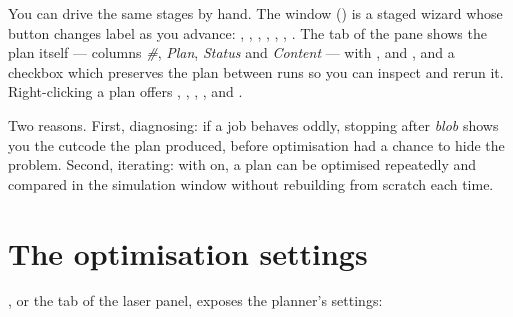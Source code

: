 \noindent You can drive the same stages by hand. The  window
() is a staged wizard whose button changes label as you
advance: , , , , , , . The
 tab of the  pane shows the plan itself ---
columns \emph{\#}, \emph{Plan}, \emph{Status} and \emph{Content} --- with
,  and , and a  checkbox which
preserves the plan between runs so you can inspect and rerun it. Right-clicking a
plan offers , , , ,
 and .

\begin{behindbox}
Two reasons. First, diagnosing: if a job behaves oddly, stopping after
\emph{blob} shows you the cutcode the plan produced, before optimisation had a
chance to hide the problem. Second, iterating: with  on, a plan can be
optimised repeatedly and compared in the simulation window without rebuilding
from scratch each time.
\end{behindbox}

\section{The optimisation settings}

, or the  tab of the laser
panel, exposes the planner's settings:

